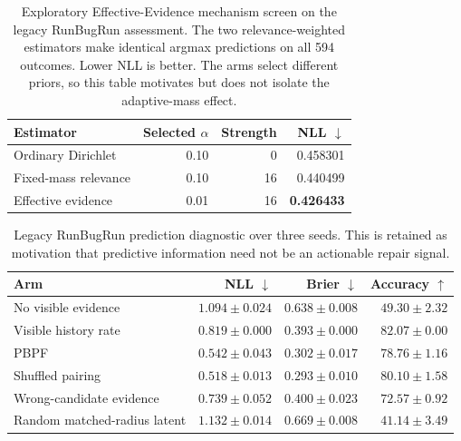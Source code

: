 
\begin{table}[t]
\centering
\caption{Exploratory Effective-Evidence mechanism screen on the legacy RunBugRun assessment.
The two relevance-weighted estimators make identical argmax predictions on all 594 outcomes.
Lower NLL is better. The arms select different priors, so this table motivates but does not
isolate the adaptive-mass effect.}
\label{tab:eed-core}
\small
\begin{tabular}{lrrr}
\toprule
Estimator & Selected $\alpha$ & Strength & NLL $\downarrow$ \\
\midrule
Ordinary Dirichlet & 0.10 & 0 & 0.458301 \\
Fixed-mass relevance & 0.10 & 16 & 0.440499 \\
Effective evidence & 0.01 & 16 & \textbf{0.426433} \\
\bottomrule
\end{tabular}
\end{table}

\begin{table}[t]
\centering
\caption{Legacy RunBugRun prediction diagnostic over three seeds. This is retained as
motivation that predictive information need not be an actionable repair signal.}
\label{tab:legacy-prediction}
\small
\begin{tabular}{lrrr}
\toprule
Arm & NLL $\downarrow$ & Brier $\downarrow$ & Accuracy $\uparrow$ \\
\midrule
No visible evidence & $1.094\pm0.024$ & $0.638\pm0.008$ & $49.30\pm2.32$ \\
Visible history rate & $0.819\pm0.000$ & $0.393\pm0.000$ & $82.07\pm0.00$ \\
PBPF & $0.542\pm0.043$ & $0.302\pm0.017$ & $78.76\pm1.16$ \\
Shuffled pairing & $0.518\pm0.013$ & $0.293\pm0.010$ & $80.10\pm1.58$ \\
Wrong-candidate evidence & $0.739\pm0.052$ & $0.400\pm0.023$ & $72.57\pm0.92$ \\
Random matched-radius latent & $1.132\pm0.014$ & $0.669\pm0.008$ & $41.14\pm3.49$ \\
\bottomrule
\end{tabular}
\end{table}

